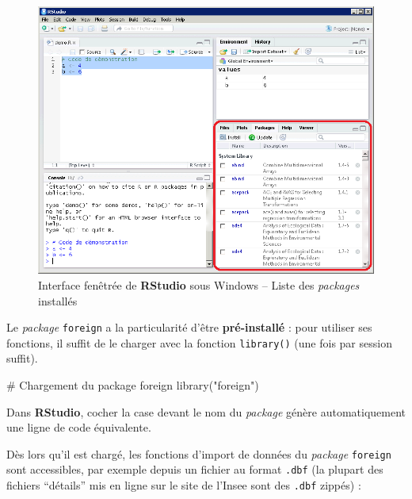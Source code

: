 \documentclass[12pt,twosided, notitlepage]{book}
\newenvironment{Shaded}{}{}
\newcommand{\KeywordTok}[1]{\textcolor[rgb]{0.00,0.00,1.00}{{#1}}}
\newcommand{\StringTok}[1]{\textcolor[rgb]{0.00,0.50,0.50}{{#1}}}
\newcommand{\CommentTok}[1]{\textcolor[rgb]{0.00,0.50,0.00}{{#1}}}
\newcommand{\NormalTok}[1]{{#1}}
\renewenvironment{Shaded}{\begin{snugshade}}{\end{snugshade}}
\begin{document}
\begin{figure}[htbp]
\centering
\includegraphics{../figures/Interface_RStudio_3.png}
\caption{Interface fenêtrée de \textbf{RStudio} sous Windows -- Liste
des \emph{packages} installés}
\end{figure}

Le \emph{package} \texttt{foreign} a la particularité d'être
\textbf{pré-installé} : pour utiliser ses fonctions, il suffit de le
charger avec la fonction \texttt{library()} (une fois par session
suffit).

\begin{Shaded}
\begin{Highlighting}[]
\CommentTok{# Chargement du package foreign}
\KeywordTok{library}\NormalTok{(}\StringTok{"foreign"}\NormalTok{)}
\end{Highlighting}
\end{Shaded}

Dans \textbf{RStudio}, cocher la case devant le nom du \emph{package}
génère automatiquement une ligne de code équivalente.

Dès lors qu'il est chargé, les fonctions d'import de données du
\emph{package} \texttt{foreign} sont accessibles, par exemple depuis un
fichier au format \texttt{.dbf} (la plupart des fichiers
\enquote{détails} mis en ligne sur le site de l'Insee sont des
\texttt{.dbf} zippés) :
\end{document}
